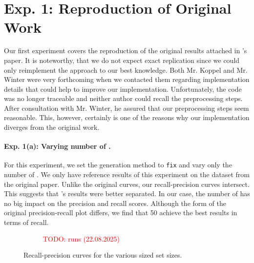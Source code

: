 
\section{Exp. 1: Reproduction of Original Work}

Our first experiment covers the reproduction of the original results attached in \citet{koppel_determining_2014}'s paper.
It is noteworthy, that we do not expect exact replication since we could only reimplement the approach to our best knowledge.
Both Mr. Koppel and Mr. Winter were very forthcoming when we contacted them regarding implementation details that could help to improve our implementation.
Unfortunately, the code was no longer traceable and neither author could recall the preprocessing steps.
After consultation with Mr. Winter, he assured that our preprocessing steps seem reasonable.
This, however, certainly is one of the reasons why our implementation diverges from the original work.

\paragraph{Exp. 1(a): Varying number of \imps{}.}

For this experiment, we set the \imp{} generation method to \texttt{fix} and vary only the number of \imps{}.
We only have reference results of this experiment on the \dataBlog{} dataset from the original paper.
Unlike the original curves, our \impAppr{} recall-precision curves intersect.
This suggests that \citet{koppel_determining_2014}'s results were better separated.
In our case, the number of \imps{} has no big impact on the precision and recall scores.
Although the form of the original precision-recall plot differs, we find that 50 \imps{} achieve the best results in terms of recall.

\begin{figure}[htbp]
  \centering
  \begin{subfigure}[b]{0.48\textwidth}
    \centering
    
    \caption{\dataBlog{} \textcolor{red}{TODO: runs (22.08.2025)}}
    \label{fig:blog_dif_n}
  \end{subfigure}
  \hfill
  \begin{subfigure}[b]{0.48\textwidth}
    \centering
    
    \caption{\dataStudent{}}
    \label{fig:student_essays_dif_n}
  \end{subfigure}
  \caption{Recall-precision curves for the various sized \imp{} set sizes.}
  \label{fig:repr_diff_n_imps_fixed}
\end{figure}


